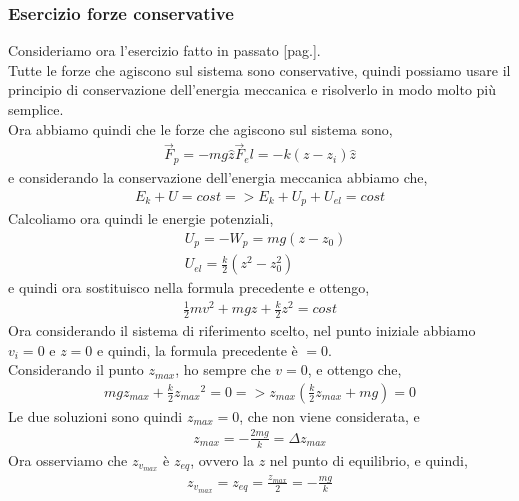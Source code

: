         \subsubsection{Esercizio forze conservative}
            Consideriamo ora l'esercizio fatto in passato [pag.\pageref{esercizioDinamicaMolla}].\\
            Tutte le forze che agiscono sul sistema sono conservative, quindi possiamo usare il principio di conservazione dell'energia meccanica e risolverlo in modo molto più semplice.\\
            Ora abbiamo quindi che le forze che agiscono sul sistema sono,
            \begin{align*}
                \vec{F}_p=-mg\hat{z}
                \vec{F}_el=-k(z-z_i)\hat{z}
            \end{align*}
            e considerando la conservazione dell'energia meccanica abbiamo che,
            \begin{align*}
                E_k+U=cost => E_k+U_p+U_{el}=cost
            \end{align*}
            Calcoliamo ora quindi le energie potenziali,
            \begin{align*}
                &U_p=-W_p=mg(z-z_0)\\
                &U_{el}=\frac{k}{2}(z^2-z_0^2)
            \end{align*}
            e quindi ora sostituisco nella formula precedente e ottengo,
            \begin{align*}
                \frac{1}{2}mv^2+mgz+\frac{k}{2}z^2=cost
            \end{align*}
            Ora considerando il sistema di riferimento scelto, nel punto iniziale abbiamo $v_i=0$ e $z=0$ e quindi, la formula precedente è $=0$.\\
            Considerando il punto $z_{max}$, ho sempre che $v=0$, e ottengo che,
            \begin{align*}
                mg z_{max}+\frac{k}{2} {z_{max}}^2=0 => z_{max}(\frac{k}{2}z_{max} + mg)=0
            \end{align*}
            Le due soluzioni sono quindi $z_{max}=0$, che non viene considerata, e
            \begin{align*}
                z_{max}=-\frac{2mg}{k}=\Delta z_{max}
            \end{align*}
            Ora osserviamo che $z_{v_{max}}$ è $z_{eq}$, ovvero la $z$ nel punto di equilibrio, e quindi,
            \begin{align*}
                z_{v_{max}}=z_{eq}=\frac{z_{max}}{2}=-\frac{mg}{k}
            \end{align*}
